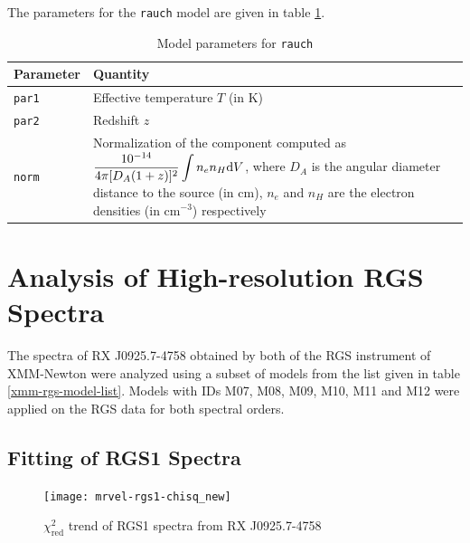 				The parameters for the \texttt{rauch} model are given in table \ref{param:rauch}.
				\begin{table}[h!]
					\centering
					\caption{Model parameters for \texttt{rauch}}
					\label{param:rauch}
					\begin{tabular}{p{}p{}}
						\hline
						\textbf{Parameter} & \textbf{Quantity} \\ \hline
						{\texttt{par1}} & {Effective temperature $T$ (in K)} \\ %
						{\texttt{par2}} & {Redshift $z$} \\ %
						{\texttt{norm}} & {Normalization of the component computed as $\displaystyle\dfrac{10^{-14}}{4\pi[D_A(1+z)]^2}\int{n_en_H\mathrm{d}V}$, where $D_A$ is the angular diameter distance to the source (in cm), $n_e$ and $n_H$ are the electron densities (in cm$^{-3}$) respectively} \\ \hline
					\end{tabular}
				\end{table}
	
	\section{Analysis of High-resolution RGS Spectra} \label{hi-resolution:analysis}
		The spectra of RX J0925.7-4758 obtained by both of the RGS instrument of XMM-Newton were analyzed using a subset of models from the list given in table \ref{xmm-rgs-model-list}. Models with IDs M07, M08, M09, M10, M11 and M12 were applied on the RGS data for both spectral orders.
		
		\subsection{Fitting of RGS1 Spectra} \label{hi-resolution:analysis:rgs1}
		
			\begin{figure}[h!]
				\centering
				\texttt{[image: mrvel-rgs1-chisq\_new]}
				\caption{$\chi^2_\text{red}$ trend of RGS1 spectra from RX J0925.7-4758}
				\label{fig:mrvel-rgs1-chisq}
			\end{figure}
			
